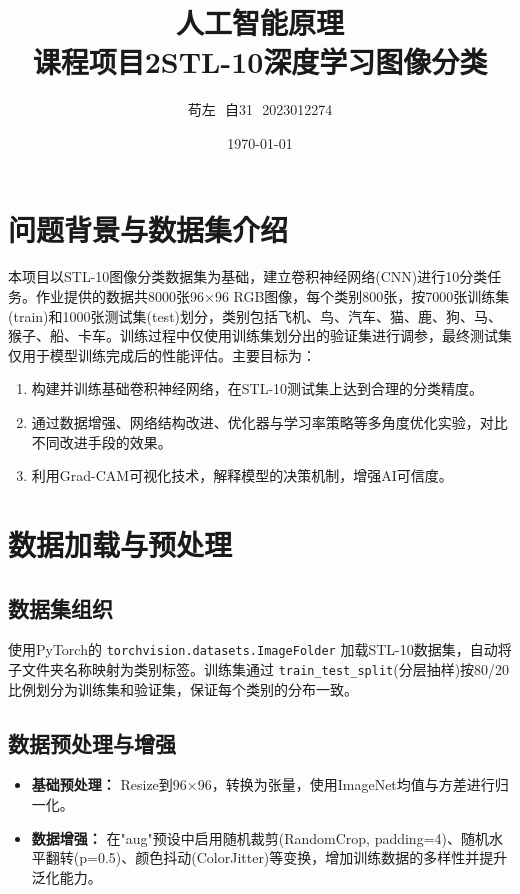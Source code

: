 \documentclass[12pt,a4paper]{ctexart}
\title{\textbf{人工智能原理\\课程项目2\quad STL-10深度学习图像分类}}
\author{苟左\,\, 自31\,\, 2023012274}
\date{\today}
\begin{document}
\maketitle

\section{问题背景与数据集介绍}

本项目以STL-10图像分类数据集为基础，建立卷积神经网络(CNN)进行10分类任务。作业提供的数据共8000张96×96 RGB图像，每个类别800张，按7000张训练集(train)和1000张测试集(test)划分，类别包括飞机、鸟、汽车、猫、鹿、狗、马、猴子、船、卡车。训练过程中仅使用训练集划分出的验证集进行调参，最终测试集仅用于模型训练完成后的性能评估。主要目标为：
\begin{enumerate}
    \item 构建并训练基础卷积神经网络，在STL-10测试集上达到合理的分类精度。
    \item 通过数据增强、网络结构改进、优化器与学习率策略等多角度优化实验，对比不同改进手段的效果。
    \item 利用Grad-CAM可视化技术，解释模型的决策机制，增强AI可信度。
\end{enumerate}

\section{数据加载与预处理}

\subsection{数据集组织}
使用PyTorch的 \texttt{torchvision.datasets.ImageFolder} 加载STL-10数据集，自动将子文件夹名称映射为类别标签。训练集通过 \texttt{train\_test\_split}(分层抽样)按80/20比例划分为训练集和验证集，保证每个类别的分布一致。

\subsection{数据预处理与增强}
\begin{itemize}
    \item \textbf{基础预处理：} Resize到96×96，转换为张量，使用ImageNet均值与方差进行归一化。
    \item \textbf{数据增强：} 在"aug"预设中启用随机裁剪(RandomCrop, padding=4)、随机水平翻转(p=0.5)、颜色抖动(ColorJitter)等变换，增加训练数据的多样性并提升泛化能力。
\end{itemize}
\end{document}
